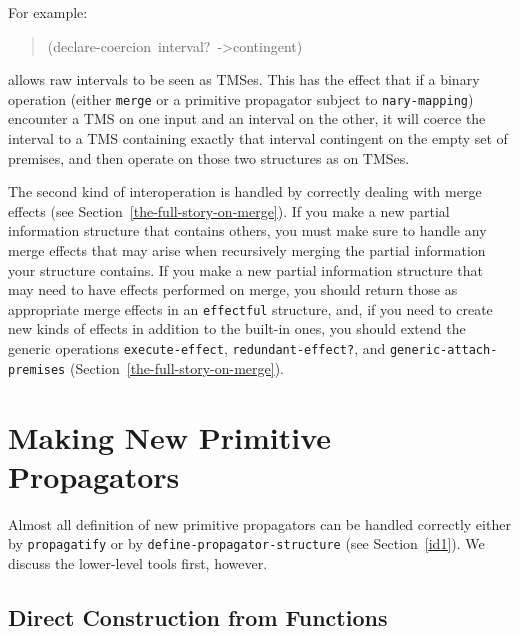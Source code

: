 \documentclass[12pt,letterpaper,english]{article}
\begin{document}
For example:
\begin{quote}{\ttfamily \raggedright \noindent
(declare-coercion~interval?~->contingent)
}\end{quote}
allows raw intervals to be seen as TMSes.  This has the effect that if
a binary operation (either \texttt{merge} or a primitive propagator subject
to \texttt{nary-mapping}) encounter a TMS on one input and an interval on
the other, it will coerce the interval to a TMS containing exactly
that interval contingent on the empty set of premises, and then
operate on those two structures as on TMSes.

The second kind of interoperation is handled by correctly dealing with
merge effects (see Section~\ref{the-full-story-on-merge}).
If you make a new partial information
structure that contains others, you must make sure to handle any merge
effects that may arise when recursively merging the partial
information your structure contains.  If you make a new partial
information structure that may need to have effects performed on
merge, you should return those as appropriate merge effects in an
\texttt{effectful} structure, and, if you need to create new kinds of
effects in addition to the built-in ones, you should extend the
generic operations \texttt{execute-effect}, \texttt{redundant-effect?}, and
\texttt{generic-attach-premises} (Section~\ref{the-full-story-on-merge}).



\section{Making New Primitive Propagators}
\label{making-new-primitive-propagators}

Almost all definition of new primitive propagators can be handled
correctly either by \texttt{propagatify} or by
\texttt{define-propagator-structure} (see Section~\ref{id1}).
We discuss the
lower-level tools first, however.



\subsection{Direct Construction from Functions}
\label{direct-construction-from-functions}
\end{document}
